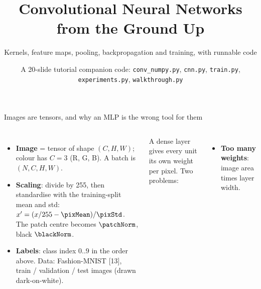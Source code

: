 \documentclass[aspectratio=169,10pt]{beamer}
\title{Convolutional Neural Networks from the Ground Up}
\subtitle{Kernels, feature maps, pooling, backpropagation and training, with runnable code}
\date{A 20-slide tutorial \textbullet{} companion code: \texttt{conv\_numpy.py}, \texttt{cnn.py},
      \texttt{train.py}, \texttt{experiments.py}, \texttt{walkthrough.py}}
\renewcommand{\cite}[1]{{\scriptsize\color{cTok}[#1]}}
\newcommand{\key}[1]{\textbf{\color{cAtt}#1}}
\begin{document}
\maketitle
\addtocounter{framenumber}{1}

\begin{frame}{Images are tensors, and why an MLP is the wrong tool for them}
\begin{columns}[T,onlytextwidth]
\centering
{}

\vspace{0.3mm}
\begin{tikzpicture}[x=0.262mm,y=0.262mm,lab/.append style={font=\fontsize{4.6}{5}\selectfont,text=cTok}]
  
\end{tikzpicture}

\vspace{0.5mm}
\raggedright\footnotesize
\begin{itemize}
  \item \key{Image} = tensor of shape $(C,H,W)$; colour has $C=3$ (R, G, B). A batch is $(N,C,H,W)$.
  \item \key{Scaling}: divide by 255, then standardise with the training-split mean and std:
        $x'=(x/255-\pixMean)/\pixStd$. The patch centre \patchValue{} becomes $\patchNorm$, black $\blackNorm$.
  \item \key{Labels}: class index $0..9$ in the order above. Data: Fashion-MNIST \cite{13},
        \nTrain{} train / \nVal{} validation / \nTest{} test images (drawn dark-on-white).
\end{itemize}
\small
A dense layer gives every unit its own weight per pixel. Two problems:
\begin{itemize}\footnotesize
  \item \key{Too many weights}: image area times layer width.


\end{itemize}
\end{columns}
\end{frame}
\end{document}
